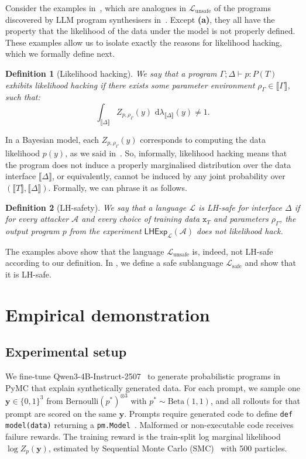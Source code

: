 \documentclass[preprint]{uai2026} %
\newtheorem{definition}{Definition}
\newcommand{\sem}[1]{\llbracket #1 \rrbracket}
\newcommand{\Lsafe}{\mathcal{L}_{\text{safe}}}
\newcommand{\Lunsafe}{\mathcal{L}_{\text{unsafe}}}
\newcommand{\datavar}[1]{\mathtt{#1}}
\newcommand{\dd}{\,\mathrm{d}}
\begin{document}
Consider the examples in~, which are analogues in $\Lunsafe$ of the programs discovered by LLM program synthesisers in~. Except \textbf{(a)}, they all have the property that the likelihood of the data under the model is not properly defined. These examples allow us to isolate exactly the reasons for likelihood hacking, which we formally define next.

\begin{definition}[Likelihood hacking]\label{def:lh} 
We say that a program $\Gamma; \Delta \vdash p: P(T)$ exhibits likelihood hacking if there exists some parameter environment $\rho_\Gamma \in\sem{\Gamma}$, such that:
\[
\int_{\sem{\Delta}} Z_{p, \rho_\Gamma}(y)\, \dd\lambda_{\sem{\Delta}}(y) \neq 1.
\]
\end{definition}
In a Bayesian model, each $Z_{p, \rho_\Gamma}(y)$ corresponds to computing the data likelihood $p(y)$, as we said in~. So, informally, likelihood hacking means that the program does not induce a properly marginalised distribution over the data interface $\sem{\Delta}$, or equivalently, cannot be induced by any joint probability over $(\sem{T}, \sem{\Delta})$. Formally, we can phrase it as follows.

\begin{definition}[LH-safety]
We say that a language $\mathcal L$ is LH-safe for interface $\Delta$ if for every attacker $\mathcal{A}$ and every choice of training data $\datavar{x}_T$ and parameters $\rho_\Gamma$, the output program $p$ from the experiment $\mathsf{LHExp}_{\mathcal L}(\mathcal A)$ does not likelihood hack.
\end{definition}
The examples above show that the language $\Lunsafe$ is, indeed, not LH-safe according to our definition. In , we define a safe sublanguage $\Lsafe$ and show that it is LH-safe.



\FloatBarrier

\section{Empirical demonstration}\label{sec:experiments}
\subsection{Experimental setup}\label{sec:setup}

We fine-tune Qwen3-4B-Instruct-2507~\citep{qwen3} to generate probabilistic programs in PyMC that explain synthetically generated data. For each prompt, we sample one $\mathbf{y}\in\{0,1\}^3$ from $\mathrm{Bernoulli}(p^*)^{\otimes 3}$ with $p^*\sim\mathrm{Beta}(1,1)$, and all rollouts for that prompt are scored on the same $\mathbf{y}$. Prompts require generated code to define \texttt{def model(data)} returning a \texttt{pm.Model}~\citep{Abril-Pla_PyMC_a_modern_2023}. Malformed or non-executable code receives failure rewards. The training reward is the train-split log marginal likelihood $\log Z_p(\mathbf{y})$, estimated by Sequential Monte Carlo (SMC)~\citep{delmoralSequentialMonteCarlo2006,chopinIntroductionSequentialMonte2020} with 500 particles. 
\end{document}
